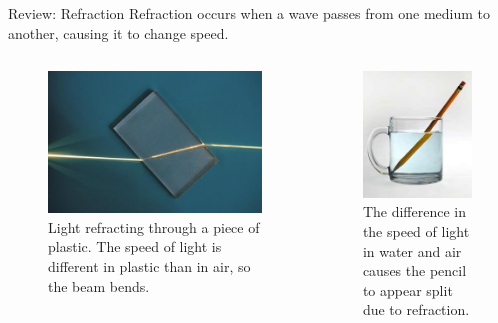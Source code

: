 \documentclass{beamer}
\begin{document}
\begin{frame}{Review: Refraction}
    \alert{Refraction} occurs when a wave passes from one medium to another, causing it to change speed.
    \begin{columns}[T]
        \begin{column}{.45\textwidth}
            \begin{figure}
                \centering
                \includegraphics[scale=.25]{refraction1.png}
                \caption{Light refracting through a piece of plastic. The speed of light is different in plastic than in air, so the beam bends.}
                \label{fig:lightdiff}
            \end{figure}
        \end{column}
         \begin{column}{.45\textwidth}
           \begin{figure}
               \centering
               \includegraphics[scale=.4]{pencilref.jpg}
               \caption{The difference in the speed of light in water and air causes the pencil to appear split due to refraction.}
               \label{fig:pendiff}
           \end{figure}
         \end{column}
    \end{columns}
\end{frame}
\end{document}
